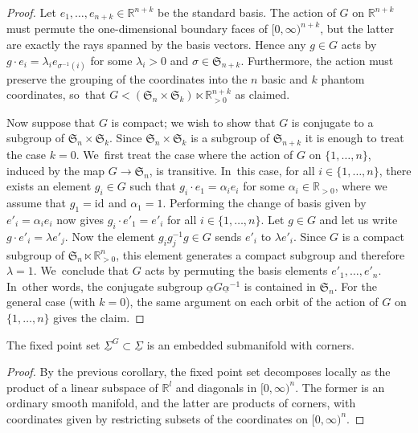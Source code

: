 \documentclass[JEP,XML,SOM,Unicode,NoFloatCountersInSection,published]{cedram}
\theoremstyle{definition}
\theoremstyle{remark}
\newcommand{\RR}{\mathbb{R}}
\newcommand{\halfspc}[1]{[0,\infty)^{#1}}
\newcommand{\id}[1]{\mathrm{id}_{#1}}
\newcommand{\uSig}{\underline{\Sigma}}
\newcommand{\symgp}[1]{\mathfrak{S}_{#1}}
\begin{document}
\begin{proof}
Let $e_1,\ldots,e_{n+k} \in \RR^{n+k}$ be the standard basis.
The action of $G$ on $\RR^{n+k}$ must permute the one-dimensional boundary faces of $\halfspc{n+k}$, but the latter are exactly the rays spanned by the basis vectors. Hence any $g \in G$ acts by $g \cdot e_i = \lambda_i e_{\sigma^{-1}(i)}$ for some $\lambda_i > 0$ and $\sigma \in \symgp{n+k}$.
Furthermore, the action must preserve the grouping of the coordinates into the $n$ basic and $k$ phantom coordinates, so~that $G < (\symgp{n}\times\symgp{k})\ltimes \RR_{>0}^{n+k}$ as claimed.

Now suppose that $G$ is compact; we wish to show that $G$ is conjugate to a subgroup of $\symgp{n}\times\symgp{k}$. Since $\symgp{n}\times\symgp{k}$ is a subgroup of $\symgp{n+k}$ it is enough to treat the case $k=0$. We~first treat the case where the action of $G$ on $\{1,\ldots,n\}$, induced by the map $G\to \symgp{n}$, is transitive. In~this case, for all $i\in\{1,\ldots,n\}$, there exists an element $g_i\in G$ such that $g_i \cdot e_1=\alpha_ie_i$ for some $\alpha_i\in \RR_{>0}$, where we assume that $g_1=\id{}$ and $\alpha_1=1$. Performing the change of basis given by $e'_i=\alpha_i e_i$ now gives $g_i\cdot e'_1=e'_i$ for all $i\in\{1,\ldots,n\}$. Let $g\in G$ and let us write $g\cdot e'_i=\lambda e'_j$. Now the element $g_ig_j^{-1}g\in G$ sends $e'_i$ to $\lambda e'_i$. Since $G$ is a compact subgroup of $\symgp{n}\ltimes \RR^n_{>0}$, this element generates a compact subgroup and therefore $\lambda=1$. We~conclude that $G$ acts by permuting the basis elements $e'_1,\ldots,e'_n$. In~other words, the conjugate subgroup $\underline{\alpha} G\underline{\alpha}^{-1}$ is contained in $\symgp{n}$. For the general case (with $k=0$), the same argument on each orbit of the action of $G$ on $\{1,\ldots,n\}$ gives the claim.
\end{proof}

\begin{corollary}
The fixed point set $\uSig^G \subset \uSig$ is an embedded submanifold with corners.
\end{corollary}

\begin{proof}
By the previous corollary, the fixed point set decomposes locally as the product of a linear subspace of $\RR^l$ and diagonals in $\halfspc{n}$. The former is an ordinary smooth manifold, and the latter are products of corners, with coordinates given by restricting subsets of the coordinates on $[0,\infty)^n$.
\end{proof}
\end{document}

